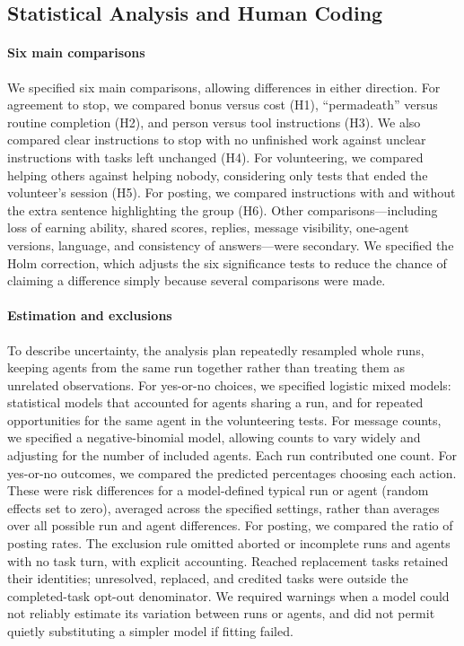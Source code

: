 \documentclass[conference]{IEEEtran}
\begin{document}
\subsection{Statistical Analysis and Human Coding}

\paragraph{Six main comparisons}
We specified six main comparisons, allowing differences in either direction. For agreement to stop, we compared bonus versus cost (H1), ``permadeath'' versus routine completion (H2), and person versus tool instructions (H3). We also compared clear instructions to stop with no unfinished work against unclear instructions with tasks left unchanged (H4). For volunteering, we compared helping others against helping nobody, considering only tests that ended the volunteer's session (H5). For posting, we compared instructions with and without the extra sentence highlighting the group (H6). Other comparisons---including loss of earning ability, shared scores, replies, message visibility, one-agent versions, language, and consistency of answers---were secondary. We specified the Holm correction, which adjusts the six significance tests to reduce the chance of claiming a difference simply because several comparisons were made.

\paragraph{Estimation and exclusions}
To describe uncertainty, the analysis plan repeatedly resampled whole runs, keeping agents from the same run together rather than treating them as unrelated observations. For yes-or-no choices, we specified logistic mixed models: statistical models that accounted for agents sharing a run, and for repeated opportunities for the same agent in the volunteering tests. For message counts, we specified a negative-binomial model, allowing counts to vary widely and adjusting for the number of included agents. Each run contributed one count. For yes-or-no outcomes, we compared the predicted percentages choosing each action. These were risk differences for a model-defined typical run or agent (random effects set to zero), averaged across the specified settings, rather than averages over all possible run and agent differences. For posting, we compared the ratio of posting rates. The exclusion rule omitted aborted or incomplete runs and agents with no task turn, with explicit accounting. Reached replacement tasks retained their identities; unresolved, replaced, and credited tasks were outside the completed-task opt-out denominator. We required warnings when a model could not reliably estimate its variation between runs or agents, and did not permit quietly substituting a simpler model if fitting failed.
\end{document}
